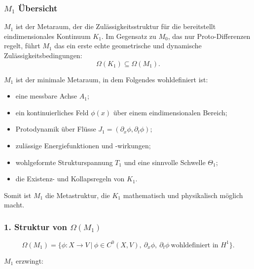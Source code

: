 

\subsubsection{\texorpdfstring{$M_1$}{M_1} Übersicht}
\label{sec:m1-overview}

$M_1$ ist der Metaraum, der die Zulässigkeitsstruktur für die bereitstellt
eindimensionales Kontinuum $K_1$.
Im Gegensatz zu $M_0$, das nur Proto-Differenzen regelt, führt $M_1$ das ein
erste echte geometrische und dynamische Zulässigkeitsbedingungen:
\[
\Omega(K_1) \subseteq \Omega(M_1).
\]

$M_1$ ist der minimale Metaraum, in dem Folgendes wohldefiniert ist:

\begin{itemize}
    \item eine messbare Achse $A_1$;
    \item ein kontinuierliches Feld $\phi(x)$ über einem eindimensionalen Bereich;
    \item Protodynamik über Flüsse $J_1=(\partial_x \phi, \partial_t \phi)$;
    \item zulässige Energiefunktionen und -wirkungen;
    \item wohlgeformte Strukturspannung $T_1$ und eine sinnvolle Schwelle $\Theta_1$;
    \item die Existenz- und Kollapsregeln von $K_1$.
\end{itemize}

Somit ist $M_1$ die Metastruktur, die $K_1$ mathematisch und physikalisch möglich macht.

\subsubsection*{1. Struktur von \texorpdfstring{$\Omega(M_1)$}{\Omega(M_1)}}

\[
\Omega(M_1)
=
\Big\{
\phi : X \to V \ \big|\
\phi \in C^{0}(X,V),\
\partial_x \phi,\ \partial_t \phi\ \text{wohldefiniert in } H^1
\Big\}.
\]

$M_1$ erzwingt:

